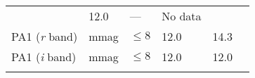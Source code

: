 \begin{longtable}[]{@{}llllll@{}}
\begin{minipage}[t]{0.17\columnwidth}
\end{minipage} & \begin{minipage}[t]{0.17\columnwidth}\raggedright\strut
12.0\strut
\end{minipage} & \begin{minipage}[t]{0.12\columnwidth}\raggedright\strut
---\strut
\end{minipage} & \begin{minipage}[t]{0.17\columnwidth}\raggedright\strut
No data\strut
\end{minipage}\tabularnewline
\begin{minipage}[t]{0.14\columnwidth}\raggedright\strut
PA1 (\emph{r} band)\strut
\end{minipage} & \begin{minipage}[t]{0.06\columnwidth}\raggedright\strut
mmag\strut
\end{minipage} & \begin{minipage}[t]{0.17\columnwidth}\raggedright\strut
\(\leq 8\)\strut
\end{minipage} & \begin{minipage}[t]{0.17\columnwidth}\raggedright\strut
12.0\strut
\end{minipage} & \begin{minipage}[t]{0.12\columnwidth}\raggedright\strut
14.3\strut
\end{minipage} & \begin{minipage}[t]{0.17\columnwidth}\raggedright\strut
\strut
\end{minipage}\tabularnewline
\begin{minipage}[t]{0.14\columnwidth}\raggedright\strut
PA1 (\emph{i} band)\strut
\end{minipage} & \begin{minipage}[t]{0.06\columnwidth}\raggedright\strut
mmag\strut
\end{minipage} & \begin{minipage}[t]{0.17\columnwidth}\raggedright\strut
\(\leq 8\)\strut
\end{minipage} & \begin{minipage}[t]{0.17\columnwidth}\raggedright\strut
12.0\strut
\end{minipage} & \begin{minipage}[t]{0.12\columnwidth}\raggedright\strut
12.0\strut
\end{minipage} & \begin{minipage}[t]{0.17\columnwidth}\raggedright\strut
\strut
\end{minipage}\tabularnewline
\begin{minipage}[t]{0.14\columnwidth}\raggedright\strut

\end{minipage}
\end{longtable}
